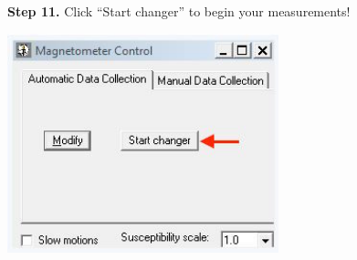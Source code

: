 \documentclass[11pt,letterpaper]{article}
\begin{document}
\begin{figure}
\begin{flushleft}
\textbf{Step 11.}
Click ``Start changer'' to begin your measurements!
\end{flushleft}
\centering
\includegraphics[width=0.7\textwidth]{images/Capture13.jpg}
\end{figure}
\end{document}

